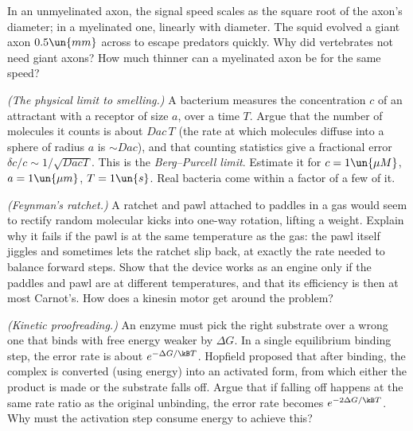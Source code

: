 \begin{problems}
 In an unmyelinated axon, the signal speed scales as the square root of the axon's diameter; in a myelinated one, linearly with diameter. The squid evolved a giant axon $0.5\un{mm}$ across to escape predators quickly. Why did vertebrates not need giant axons? How much thinner can a myelinated axon be for the same speed?

\core \emph{(The physical limit to smelling.)} A bacterium measures the concentration $c$ of an attractant with a receptor of size $a$, over a time $T$. Argue that the number of molecules it counts is about $Dac\,T$ (the rate at which molecules diffuse into a sphere of radius $a$ is $\sim Dac$), and that counting statistics give a fractional error $\delta c/c\sim1/\sqrt{DacT}$. This is the \emph{Berg--Purcell limit}. Estimate it for $c = 1\un{\mu M}$, $a = 1\un{\mu m}$, $T=1\un{s}$. Real bacteria come within a factor of a few of it.

 \label{prob:ratchet} \emph{(Feynman's ratchet.)} A ratchet and pawl attached to paddles in a gas would seem to rectify random molecular kicks into one-way rotation, lifting a weight. Explain why it fails if the pawl is at the same temperature as the gas: the pawl itself jiggles and sometimes lets the ratchet slip back, at exactly the rate needed to balance forward steps. Show that the device works as an engine only if the paddles and pawl are at different temperatures, and that its efficiency is then at most Carnot's. How does a kinesin motor get around the problem?

 \label{prob:proofreading} \emph{(Kinetic proofreading.)} An enzyme must pick the right substrate over a wrong one that binds with free energy weaker by $\Delta G$. In a single equilibrium binding step, the error rate is about $e^{-\Delta G/\kB T}$. Hopfield proposed that after binding, the complex is converted (using energy) into an activated form, from which either the product is made or the substrate falls off. Argue that if falling off happens at the same rate ratio as the original unbinding, the error rate becomes $e^{-2\Delta G/\kB T}$. Why must the activation step consume energy to achieve this?
\end{problems}

\begin{reading}
\end{reading}
